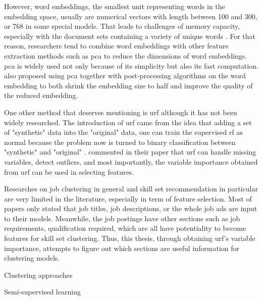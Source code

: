 \documentclass[a4paper,man,floatsintext,natbib,noextraspace]{apa6}
\makeatletter
\renewcommand{\subsection}{\@startsection{subsection}{2}
  {\z@}
  {\b@level@two@skip}
  {\e@level@two@skip}
  {\normalfont\normalsize\bfseries}}
\renewcommand{\subsubsection}{\@startsection{subsubsection}{3}
  {\z@}
  {\b@level@two@skip}
  {\e@level@two@skip}
  {\normalfont\normalsize\bfseries\itshape}}
\makeatother
\begin{document}
However, word embeddings, the smallest unit representing words in the embedding space, usually are numerical vectors with length between 100 and 300, or 768 in some special models. That leads to challenges of memory capacity, especially with the document sets containing a variety of unique words \citep{raunakEffectiveDimensionalityReduction2019}. For that reason, researchers tend to combine word embeddings with other feature extraction methods such as \gls{pca} to reduce the dimensions of word embeddings. \gls{pca} is widely used not only because of its simplicity but also its fast computation. \cite{raunakEffectiveDimensionalityReduction2019} also proposed using \gls{pca} together with post-processing algorithms on the word embedding to both shrink the embedding size to half and improve the quality of the reduced embedding.

One other method that deserves mentioning is \gls{urf} although it has not been widely researched. The introduction of \gls{urf} came from the idea that adding a set of "synthetic" data into the "original" data, one can train the supervised \gls{rf} as normal because the problem now is turned to binary classification between "synthetic" and "original" \citep[as cited in \citealp{shiUnsupervisedLearningRandom2006}]{breimanRandomForests2001}. \cite{elghazelUnsupervisedFeatureSelection2015} commented in their paper that \gls{urf} can handle missing variables, detect outliers, and most importantly, the variable importance obtained from \gls{urf} can be used in selecting features.

Researches on job clustering in general and skill set recommendation in particular are very limited in the literature, especially in term of feature selection. Most of papers only stated that job titles, job descriptions, or the whole job ads are input to their models. Meanwhile, the job postings have other sections such as job requirements, qualification required, which are all have potentiality to become features for skill set clustering. Thus, this thesis, through obtaining \gls{urf}'s variable importance, attempts to figure out which sections are useful information for clustering models.

\subsection{Clustering approaches}

\subsubsection{Semi-supervised learning}
\end{document}
